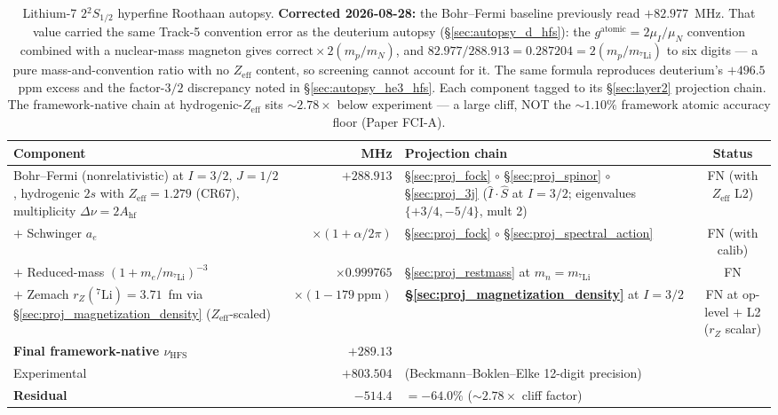 \documentclass[11pt]{article}
\begin{document}
\begin{table}[h]
\centering\small
\begin{tabular}{p{4.8cm} r p{5.5cm} c}
\toprule
Component & MHz & Projection chain & Status \\
\midrule
Bohr--Fermi (nonrelativistic) at $I=3/2$, $J=1/2$, hydrogenic $2s$
with $Z_\text{eff} = 1.279$ (CR67), multiplicity $\Delta\nu = 2 A_\text{hf}$ &
$+288.913$ &
\S\ref{sec:proj_fock} $\circ$ \S\ref{sec:proj_spinor} $\circ$
\S\ref{sec:proj_3j} ($\hat{I}\cdot\hat{S}$ at $I=3/2$;
eigenvalues $\{+3/4, -5/4\}$, mult 2) & FN (with $Z_\text{eff}$ L2) \\
$+$ Schwinger $a_e$ & $\times(1+\alpha/2\pi)$ &
\S\ref{sec:proj_fock} $\circ$ \S\ref{sec:proj_spectral_action} & FN (with calib) \\
$+$ Reduced-mass $(1+m_e/m_{{}^7\!\text{Li}})^{-3}$ & $\times 0.999765$ &
\S\ref{sec:proj_restmass} at $m_n = m_{{}^7\!\text{Li}}$ & FN \\
$+$ Zemach $r_Z({}^7\text{Li})=3.71$~fm via
\S\ref{sec:proj_magnetization_density} ($Z_\text{eff}$-scaled) &
$\times(1 - 179~\text{ppm})$ &
\textbf{\S\ref{sec:proj_magnetization_density}} at $I=3/2$ &
FN at op-level $+$ L2 ($r_Z$ scalar) \\
\midrule
\textbf{Final framework-native $\nu_\text{HFS}$} & $+289.13$ & & \\
Experimental & $+803.504$ & (Beckmann--Boklen--Elke 12-digit precision) & \\
\textbf{Residual} & $-514.4$ & $= -64.0\%$
($\sim 2.78\times$ cliff factor) & \\
\bottomrule
\end{tabular}
\caption{Lithium-7 $2{}^2S_{1/2}$ hyperfine Roothaan autopsy.
\textbf{Corrected 2026-08-28:} the Bohr--Fermi baseline previously read
$+82.977$~MHz.  That value carried the same Track-5 convention error as
the deuterium autopsy (\S\ref{sec:autopsy_d_hfs}): the $g^\text{atomic} =
2\mu_I/\mu_N$ convention combined with a nuclear-mass magneton gives
$\text{correct} \times 2(m_p/m_N)$, and $82.977/288.913 = 0.287204 =
2(m_p/m_{{}^7\!\text{Li}})$ to six digits --- a pure mass-and-convention
ratio with no $Z_\text{eff}$ content, so screening cannot account for it.
The same formula reproduces deuterium's $+496.5$~ppm excess and the
factor-$3/2$ discrepancy noted in \S\ref{sec:autopsy_he3_hfs}.  Each
component tagged to its \S\ref{sec:layer2} projection chain.  The
framework-native chain at hydrogenic-$Z_\text{eff}$ sits $\sim 2.78\times$
below experiment --- a large cliff, NOT the
$\sim 1.10\%$ framework atomic accuracy floor (Paper FCI-A).}
\label{tab:autopsy_li7_hfs}
\end{table}
\end{document}
